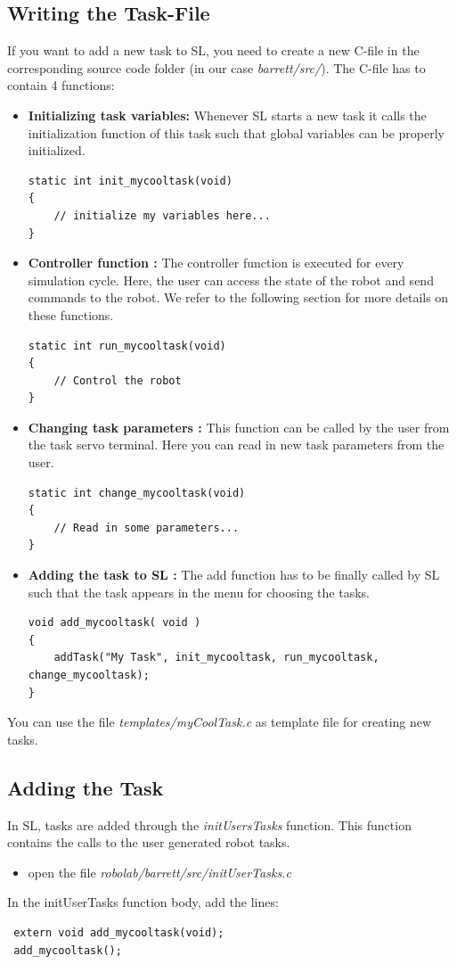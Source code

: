 \documentclass[11pt, article, colorback]{article}
\begin{document}
\subsection{Writing the Task-File}
If you want to add a new task to SL, you need to create a new C-file in the corresponding source code folder (in our case {\em barrett/src/}). The C-file has to contain 4 functions:
\begin{itemize}
 \item {\bf Initializing task variables: }
Whenever SL starts a new task it calls the initialization function of this task such that global variables can be properly initialized.
\begin{lstlisting}
static int init_mycooltask(void) 
{
    // initialize my variables here...        
}
\end{lstlisting}
 \item {\bf Controller function : } The controller function is executed for every simulation cycle. Here, the user can access the state of the robot and send commands to the robot. We refer to the following section for more details
on these functions. 
\begin{lstlisting}
static int run_mycooltask(void) 
{
    // Control the robot
}
\end{lstlisting}

\item {\bf Changing task parameters : } This function can be called by the user from the task servo terminal. Here you can read in new task parameters from the user.
\begin{lstlisting}
static int change_mycooltask(void) 
{
    // Read in some parameters...
}
\end{lstlisting}

 \item {\bf Adding the task to SL : } The add function has to be finally called by SL such that the task appears in the menu for choosing the tasks.
\begin{lstlisting}
void add_mycooltask( void )
{
    addTask("My Task", init_mycooltask, run_mycooltask, change_mycooltask);			
}    
\end{lstlisting}
\end{itemize}
You can use the file {\em templates/myCoolTask.c} as template file for creating new tasks.

\subsection{Adding the Task}
In SL, tasks are added through the {\em initUsersTasks} function. This function contains the calls to the user generated robot tasks.
\begin{itemize}
  \item  open the file {\em robolab/barrett/src/initUserTasks.c}
\end{itemize}
%
In the initUserTasks function body, add the lines:
\begin{lstlisting}
 extern void add_mycooltask(void);
 add_mycooltask();
\end{lstlisting}
\end{document}
